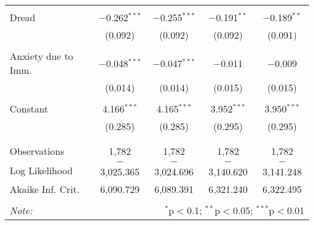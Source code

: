 \begin{table}[!htbp]
\begin{tabular}{@{\extracolsep{5pt}}lcccc}
  & & & & \\ 
 Dread & $-$0.262$^{***}$ & $-$0.255$^{***}$ & $-$0.191$^{**}$ & $-$0.189$^{**}$ \\ 
  & (0.092) & (0.092) & (0.092) & (0.091) \\ 
  & & & & \\ 
 Anxiety due to Imm. & $-$0.048$^{***}$ & $-$0.047$^{***}$ & $-$0.011 & $-$0.009 \\ 
  & (0.014) & (0.014) & (0.015) & (0.015) \\ 
  & & & & \\ 
 Constant & 4.166$^{***}$ & 4.165$^{***}$ & 3.952$^{***}$ & 3.950$^{***}$ \\ 
  & (0.285) & (0.285) & (0.295) & (0.295) \\ 
  & & & & \\ 
\hline \\[-1.8ex] 
Observations & 1,782 & 1,782 & 1,782 & 1,782 \\ 
Log Likelihood & $-$3,025.365 & $-$3,024.696 & $-$3,140.620 & $-$3,141.248 \\ 
Akaike Inf. Crit. & 6,090.729 & 6,089.391 & 6,321.240 & 6,322.495 \\ 
\hline 
\hline \\[-1.8ex] 
\textit{Note:}  & \multicolumn{4}{r}{$^{*}$p$<$0.1; $^{**}$p$<$0.05; $^{***}$p$<$0.01} \\ 
\end{tabular} 
\end{table} 
